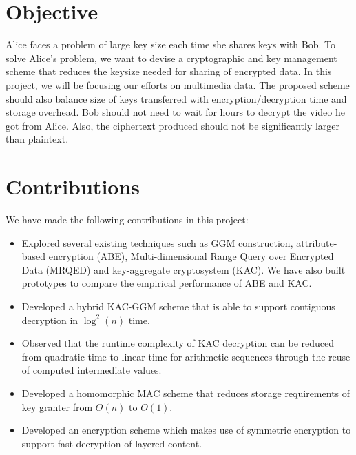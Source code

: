 \documentclass[hyp,a4paper,12pt,openbib]{socreport}
\begin{document}
\section{Objective}


Alice faces a problem of large key size each time she shares keys with Bob. To solve Alice's problem, we want to devise a cryptographic and key management scheme that reduces the keysize needed for sharing of encrypted data. In this project, we will be focusing our efforts on multimedia data. The proposed scheme should also balance size of keys transferred with encryption/decryption time and storage overhead. Bob should not need to wait for hours to decrypt the video he got from Alice. Also, the ciphertext produced should not be significantly larger than plaintext.

\section{Contributions}
We have made the following contributions in this project:


\begin{itemize}
\item Explored several existing techniques such as GGM construction, attribute-based encryption (ABE), Multi-dimensional Range Query over Encrypted Data (MRQED) and key-aggregate cryptosystem (KAC). We have also built prototypes to compare the empirical performance of ABE and KAC.
\item Developed a hybrid KAC-GGM scheme that is able to support contiguous decryption in $\log^2(n)$ time.
\item Observed that the runtime complexity of KAC decryption can be reduced from quadratic time to linear time for arithmetic sequences through the reuse of computed intermediate values. 
\item Developed a homomorphic MAC scheme that reduces storage requirements of key granter from $\Theta(n)$ to $O(1)$. 
\item Developed an encryption scheme which makes use of symmetric encryption to support fast decryption of layered content.
\end{itemize}
\end{document}
